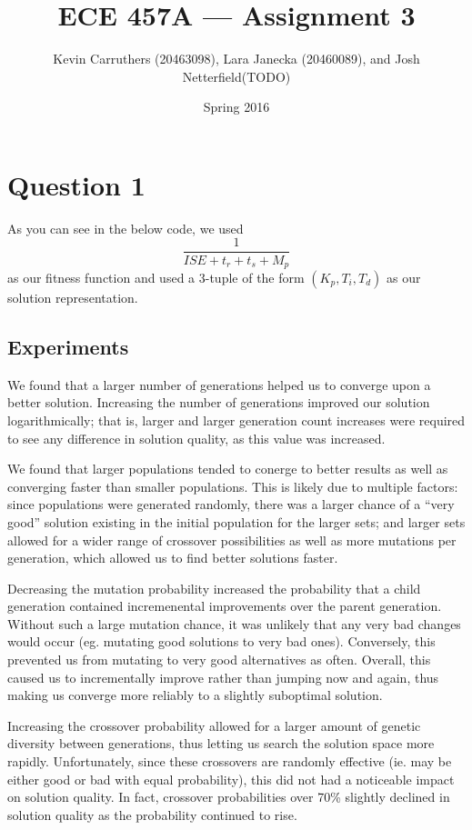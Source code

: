 \documentclass[12pt]{article}
\begin{document}
\title{ECE 457A --- Assignment 3}
\author{Kevin Carruthers (20463098), Lara Janecka (20460089), and Josh Netterfield(TODO)}
\date{\vspace{-2ex}Spring 2016}
\maketitle\HRule

\section*{Question 1}
As you can see in the below code, we used \[ \frac{1}{ISE + t_r + t_s + M_p} \] as our fitness function and used a 3-tuple of the form $(K_p, T_i, T_d)$ as our solution representation.



\subsection*{Experiments}
We found that a larger number of generations helped us to converge upon a better solution. Increasing the number of generations improved our solution logarithmically; that is, larger and larger generation count increases were required to see any difference in solution quality, as this value was increased.

We found that larger populations tended to conerge to better results as well as converging faster than smaller populations. This is likely due to multiple factors: since populations were generated randomly, there was a larger chance of a ``very good'' solution existing in the initial population for the larger sets; and larger sets allowed for a wider range of crossover possibilities as well as more mutations per generation, which allowed us to find better solutions faster.

Decreasing the mutation probability increased the probability that a child generation contained incremenental improvements over the parent generation. Without such a large mutation chance, it was unlikely that any very bad changes would occur (eg. mutating good solutions to very bad ones). Conversely, this prevented us from mutating to very good alternatives as often. Overall, this caused us to incrementally improve rather than jumping now and again, thus making us converge more reliably to a slightly suboptimal solution.

Increasing the crossover probability allowed for a larger amount of genetic diversity between generations, thus letting us search the solution space more rapidly. Unfortunately, since these crossovers are randomly effective (ie. may be either good or bad with equal probability), this did not had a noticeable impact on solution quality. In fact, crossover probabilities over 70\% slightly declined in solution quality as the probability continued to rise.
\end{document}
